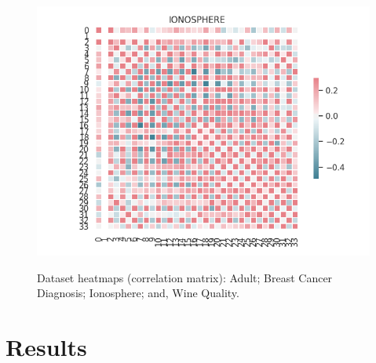\documentclass{article}
\begin{document}
\begin{figure}
{\includegraphics[scale = 0.39]{figs/heatmaps/IONOSPHERE.png}}%
\hspace{8pt}%
%
\caption[Dataset heatmaps (correlation matrix).]{Dataset heatmaps (correlation matrix):
 Adult;
 Breast Cancer Diagnosis;
 Ionosphere; and,
 Wine Quality.}%
\label{fig:ex3}%
\end{figure}

\section{Results}
\label{section:results}
\end{document}
